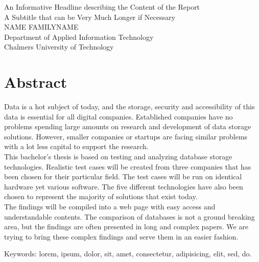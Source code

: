 An Informative Headline describing the Content of the Report\\
A Subtitle that can be Very Much Longer if Necessary\\
NAME FAMILYNAME\\
Department of Applied Information Technology\\
Chalmers University of Technology \setlength{\parskip}{0.5cm}

\thispagestyle{plain}			%
\setlength{\parskip}{0pt plus 1.0pt}
\section*{Abstract}
Data is a hot subject of today, and the storage, security and accessibility of this data is essential for all digital companies. Established companies have no problems spending large amounts on research and development of data storage solutions. However, smaller companies or startups are facing similar problems with a lot less capital to support the research. 
\\[0.5cm]
This bachelor's thesis is based on testing and analyzing database storage technologies. Realistic test cases will be created from three companies that has been chosen for their particular field. The test cases will be run on identical hardware yet various software. The five different technologies have also been chosen to represent the majority of solutions that exist today. 
\\[0.5cm]
The findings will be compiled into a web page with easy access and understandable contents. The comparison of databases is not a ground breaking area, but the findings are often presented in long and complex papers. We are trying to bring these complex findings and serve them in an easier fashion.

\vfill
Keywords: lorem, ipsum, dolor, sit, amet, consectetur, adipisicing, elit, sed, do.
